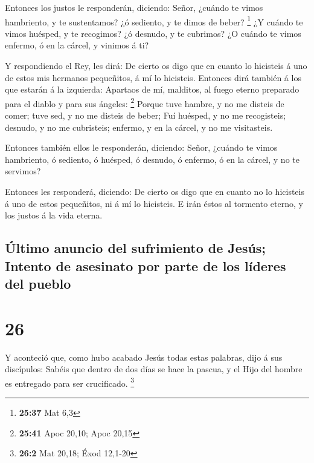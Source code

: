  Entonces los justos le responderán, diciendo: Señor,
¿cuándo te vimos hambriento, y te sustentamos? ¿ó sediento, y te dimos
de beber? \footnote{\textbf{25:37} Mat 6,3}  ¿Y cuándo te
vimos huésped, y te recogimos? ¿ó desnudo, y te cubrimos? 
¿O cuándo te vimos enfermo, ó en la cárcel, y vinimos á ti?

 Y respondiendo el Rey, les dirá: De cierto os digo que en
cuanto lo hicisteis á uno de estos mis hermanos pequeñitos, á mí lo
hicisteis.  Entonces dirá también á los que estarán á la
izquierda: Apartaos de mí, malditos, al fuego eterno preparado para el
diablo y para sus ángeles: \footnote{\textbf{25:41} Apoc 20,10; Apoc
  20,15}  Porque tuve hambre, y no me disteis de comer;
tuve sed, y no me disteis de beber;  Fuí huésped, y no me
recogisteis; desnudo, y no me cubristeis; enfermo, y en la cárcel, y no
me visitasteis.

 Entonces también ellos le responderán, diciendo: Señor,
¿cuándo te vimos hambriento, ó sediento, ó huésped, ó desnudo, ó
enfermo, ó en la cárcel, y no te servimos?

 Entonces les responderá, diciendo: De cierto os digo que
en cuanto no lo hicisteis á uno de estos pequeñitos, ni á mí lo
hicisteis.  E irán éstos al tormento eterno, y los justos á
la vida eterna.

\hypertarget{uxfaltimo-anuncio-del-sufrimiento-de-jesuxfas-intento-de-asesinato-por-parte-de-los-luxedderes-del-pueblo}{%
\subsection{Último anuncio del sufrimiento de Jesús; Intento de
asesinato por parte de los líderes del
pueblo}\label{uxfaltimo-anuncio-del-sufrimiento-de-jesuxfas-intento-de-asesinato-por-parte-de-los-luxedderes-del-pueblo}}

\hypertarget{section-25}{%
\section{26}\label{section-25}}

 Y aconteció que, como hubo acabado Jesús todas estas
palabras, dijo á sus discípulos:  Sabéis que dentro de dos
días se hace la pascua, y el Hijo del hombre es entregado para ser
crucificado. \footnote{\textbf{26:2} Mat 20,18; Éxod 12,1-20}

